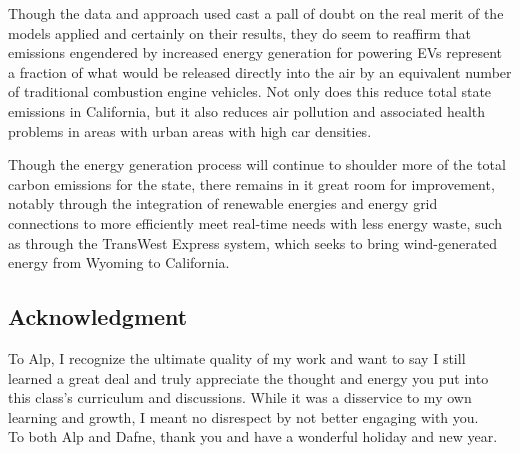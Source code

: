 \documentclass{article}
\begin{document}
Though the data and approach used cast a pall of doubt on the real merit of the models applied and certainly on their results, they do seem to reaffirm that emissions engendered by increased energy generation for powering EVs represent a fraction of what would be released directly into the air by an equivalent number of traditional combustion engine vehicles. Not only does this reduce total state emissions in California, but it also reduces air pollution and associated health problems in areas with urban areas with high car densities.

Though the energy generation process will continue to shoulder more of the total carbon emissions for the state, there remains in it great room for improvement, notably through the integration of renewable energies and energy grid connections to more efficiently meet real-time needs with less energy waste, such as through the TransWest Express system, which seeks to bring wind-generated energy from Wyoming to California. \citep{transwest}


\subsection*{Acknowledgment}
To Alp, I recognize the ultimate quality of my work and want to say I still learned a great deal and truly appreciate the thought and energy you put into this class's curriculum and discussions. While it was a disservice to my own learning and growth, I meant no disrespect by not better engaging with you.\\
To both Alp and Dafne, thank you and have a wonderful holiday and new year.

\medskip


\end{document}
